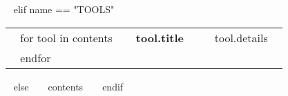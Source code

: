 \begin{minipage}{\textwidth}
~{ elif name == "TOOLS" }~
  \begin{tabular}{ @{} p{32mm} p{135mm} @{} }
  ~{ for tool in contents }~
    \bf\small ~{{ tool.title }}~ & {\small ~{{ tool.details }}~} \\
  ~{ endfor }~
  \end{tabular}
  \vspace{10mm}
~{ else }~
  ~{{ contents }}~
  \bigskip
~{ endif }~
\end{minipage}
